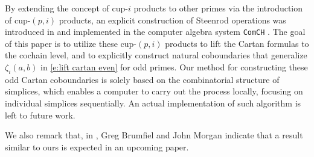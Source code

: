 By extending the concept of cup-$i$ products to other primes via the introduction of cup-$(p,i)$ products, an explicit construction of Steenrod operations was introduced in \cite{medina2021may_st} and implemented in the computer algebra system \texttt{ComCH} \cite{medina2021comch}.
The goal of this paper is to utilize these cup-$(p,i)$ products to lift the Cartan formulas to the cochain level, and to explicitly construct natural coboundaries that generalize $\zeta_i(a,b)$ in \cref{e:lift cartan even} for odd primes.
Our method for constructing these odd Cartan coboundaries is solely based on the combinatorial structure of simplices, which enables a computer to carry out the process locally, focusing on individual simplices sequentially.
An actual implementation of such algorithm is left to future work.

We also remark that, in \cite{brumfiel2023explicit}, Greg Brumfiel and John Morgan indicate that a result similar to ours is expected in an upcoming paper.
